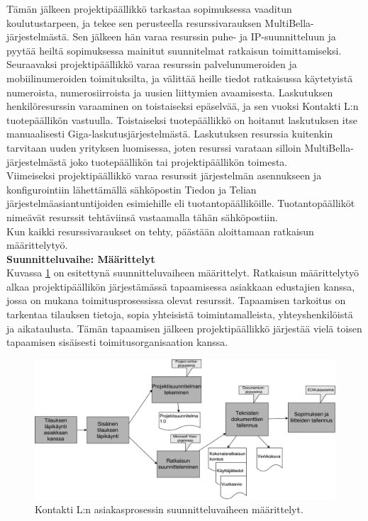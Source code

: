 \documentclass[finnish,12pt,a4paper,pdftex]{article}
\begin{document}
Tämän jälkeen projektipäällikkö tarkastaa sopimuksessa vaaditun koulutustarpeen, ja tekee sen perusteella resurssivarauksen MultiBella-järjestelmästä. Sen jälkeen hän varaa resurssin puhe- ja IP-suunnitteluun ja pyytää heiltä sopimuksessa mainitut suunnitelmat ratkaisun toimittamiseksi.\\

Seuraavaksi projektipäällikkö varaa resurssin palvelunumeroiden ja mobiilinumeroiden toimituksilta, ja välittää heille tiedot ratkaisussa käytetyistä numeroista, numerosiirroista ja uusien liittymien avaamisesta. Laskutuksen henkilöresurssin varaaminen on toistaiseksi epäselvää, ja sen vuoksi Kontakti L:n tuotepäällikön vastuulla. Toistaiseksi tuotepäällikkö on hoitanut laskutuksen itse manuaalisesti Giga-laskutusjärjestelmästä. Laskutuksen resurssia kuitenkin tarvitaan uuden yrityksen luomisessa, joten resurssi varataan silloin MultiBella-järjestelmästä joko tuotepäällikön tai projektipäällikön toimesta.\\

Viimeiseksi projektipäällikkö varaa resurssit järjestelmän asennukseen ja konfigurointiin lähettämällä sähköpostin Tiedon ja Telian järjestelmäasiantuntijoiden esimiehille eli tuotantopäälliköille. Tuotantopäälliköt nimeävät resurssit tehtäviinsä vastaamalla tähän sähköpostiin.\\

Kun kaikki resurssivaraukset on tehty, päästään aloittamaan ratkaisun määrittelytyö.\\

\textbf{Suunnitteluvaihe: Määrittelyt}\\

Kuvassa \ref{fig:maarittely} on esitettynä suunnitteluvaiheen määrittelyt. Ratkaisun määrittelytyö alkaa projektipäällikön järjestämässä tapaamisessa asiakkaan edustajien kanssa, jossa on mukana toimitusprosessissa olevat resurssit. Tapaamisen tarkoitus on tarkentaa tilauksen tietoja, sopia yhteisistä toimintamalleista, yhteyshenkilöistä ja aikataulusta. Tämän tapaamisen jälkeen projektipäällikkö järjestää vielä toisen tapaamisen sisäisesti toimitusorganisaation kanssa.\\

\begin{figure}[!h]
    \centering
    \includegraphics[scale=0.25]{images/maarittely.pdf}
    \caption{Kontakti L:n asiakasprosessin suunnitteluvaiheen määrittelyt.}
    \label{fig:maarittely}
\end{figure}
\end{document}
